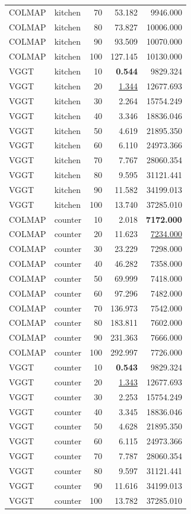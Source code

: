 \begin{table}[H]
\begin{tabular}{llrrr}
COLMAP & kitchen & 70 & 53.182 & 9946.000 \\
COLMAP & kitchen & 80 & 73.827 & 10006.000 \\
COLMAP & kitchen & 90 & 93.509 & 10070.000 \\
COLMAP & kitchen & 100 & 127.145 & 10130.000 \\
VGGT & kitchen & 10 & \textbf{0.544} & 9829.324 \\
VGGT & kitchen & 20 & \underline{1.344} & 12677.693 \\
VGGT & kitchen & 30 & 2.264 & 15754.249 \\
VGGT & kitchen & 40 & 3.346 & 18836.046 \\
VGGT & kitchen & 50 & 4.619 & 21895.350 \\
VGGT & kitchen & 60 & 6.110 & 24973.366 \\
VGGT & kitchen & 70 & 7.767 & 28060.354 \\
VGGT & kitchen & 80 & 9.595 & 31121.441 \\
VGGT & kitchen & 90 & 11.582 & 34199.013 \\
VGGT & kitchen & 100 & 13.740 & 37285.010 \\
\midrule
COLMAP & counter & 10 & 2.018 & \textbf{7172.000} \\
COLMAP & counter & 20 & 11.623 & \underline{7234.000} \\
COLMAP & counter & 30 & 23.229 & 7298.000 \\
COLMAP & counter & 40 & 46.282 & 7358.000 \\
COLMAP & counter & 50 & 69.999 & 7418.000 \\
COLMAP & counter & 60 & 97.296 & 7482.000 \\
COLMAP & counter & 70 & 136.973 & 7542.000 \\
COLMAP & counter & 80 & 183.811 & 7602.000 \\
COLMAP & counter & 90 & 231.363 & 7666.000 \\
COLMAP & counter & 100 & 292.997 & 7726.000 \\
VGGT & counter & 10 & \textbf{0.543} & 9829.324 \\
VGGT & counter & 20 & \underline{1.343} & 12677.693 \\
VGGT & counter & 30 & 2.253 & 15754.249 \\
VGGT & counter & 40 & 3.345 & 18836.046 \\
VGGT & counter & 50 & 4.628 & 21895.350 \\
VGGT & counter & 60 & 6.115 & 24973.366 \\
VGGT & counter & 70 & 7.787 & 28060.354 \\
VGGT & counter & 80 & 9.597 & 31121.441 \\
VGGT & counter & 90 & 11.616 & 34199.013 \\
VGGT & counter & 100 & 13.782 & 37285.010 \\
\bottomrule
\end{tabular}
\end{table}